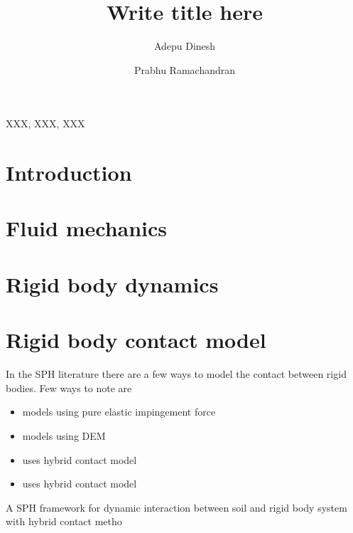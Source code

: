 \documentclass[preprint,12pt]{elsarticle}
\begin{document}
\begin{frontmatter}

  \title{Write title here}
  \author[IITB]{Adepu Dinesh }
   \author[IITB]{Prabhu Ramachandran}
   \address[IITB]{Department of Aerospace
    Engineering, Indian Institute of Technology Bombay, Powai, Mumbai 400076}


\begin{abstract}
\end{abstract}

\begin{keyword}
{XXX}, {XXX}, {XXX}


\end{keyword}

\end{frontmatter}


\section{Introduction}
\label{sec:intro}



\section{Fluid mechanics}
\label{sec:fluid-mechanics}



\section{Rigid body dynamics}
\label{sec:rbd-dynamics}




\section{Rigid body contact model}
\label{sec:rbd-contact-model}

In the SPH literature there are a few ways to model the contact
between rigid bodies. Few ways to note are

\begin{itemize}
\item \citet{albano2016modelling} models using pure elastic impingement force
\item \citet{choidevelopment} models using DEM
\item \citet{zhan2020sph} uses hybrid contact model
\item \citet{} uses hybrid contact model
\end{itemize}
A  SPH  framework  for  dynamic interaction  between  soil  and  rigid  body  system  with  hybrid contact   metho
\end{document}
